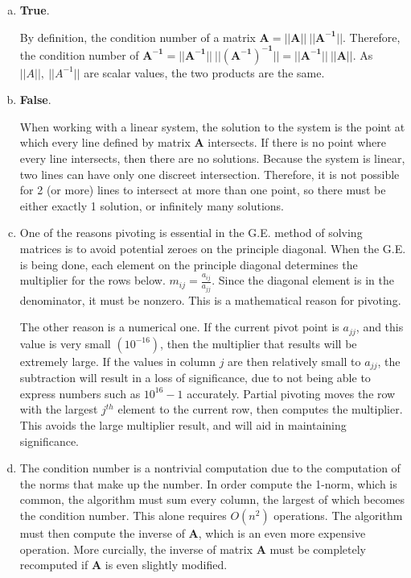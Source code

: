 \documentclass[11pt]{article}
\begin{document}
\begin{enumerate}
\begin{enumerate}[(a)]
		\item \textbf{True}.

		By definition, the condition number of a matrix $\mathbf{A = ||A||\ ||A^{-1}||}$. Therefore, the condition number of
		$\mathbf{A^{-1} = ||A^{-1}||\ ||(A^{-1})^{-1}|| = ||A^{-1}||\ ||A||}$. As $||A||,\ ||A^{-1}||$ are scalar values, the two products are the same. \\

		\item \textbf{False}.

		When working with a linear system, the solution to the system is the point at which every line defined by matrix $\mathbf{A}$ intersects. If there is no
		point where every line intersects, then there are no solutions. Because the system is
		linear, two lines can have only one discreet intersection. Therefore, it is not possible for 2 (or more) lines to intersect at more than one point, so there
		must be either exactly 1 solution, or infinitely many solutions. \\

		\item One of the reasons pivoting is essential in the G.E. method of solving matrices is to avoid potential zeroes on the principle
		diagonal. When the G.E. is being done, each element on the principle diagonal determines the multiplier for the rows below. $m_{ij}
		= \frac{a_{ij}}{a_{jj}}$. Since the diagonal element is in the denominator, it must be nonzero. This is a mathematical reason for
		pivoting.

		The other reason is a numerical one. If the current pivot point is $a_{jj}$, and this value is very small $(10^{-16})$, then the
		multiplier that results will be extremely large. If the values in column $j$ are then relatively small to $a_{jj}$, the subtraction
		will result in a loss of significance, due to not being able to express numbers such as $10^{16}-1$ accurately. Partial pivoting moves
		the row with the largest $j^{th}$ element to the current row, then computes the multiplier. This avoids the large multiplier result,
		and will aid in maintaining significance. \\

		\item The condition number is a nontrivial computation due to the computation of the norms that make up the number. In order
		compute the 1-norm, which is common, the algorithm must sum every column, the largest of which becomes the condition number.
		This alone requires $O(n^2)$ operations. The algorithm must then compute the inverse of $\mathbf{A}$, which is an even more
		expensive operation. More curcially, the inverse of matrix $\mathbf{A}$ must be completely recomputed if $\mathbf{A}$ is even
		slightly modified. \\


\end{enumerate}
\end{enumerate}
\end{document}
